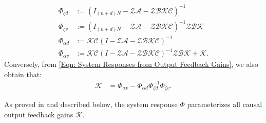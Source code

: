 \documentclass[letterpaper, 10 pt, conference]{ieeeconf}
\newcommand{\A}{\mathcal{A}}
\newcommand{\B}{\mathcal{B}}
\newcommand{\C}{\mathcal{C}}
\newcommand{\K}{\mathcal{K}}
\newcommand{\Z}{\mathcal{Z}}
\newcommand{\?}{\stackrel{?}{=}}
\newcommand{\paramDim}{d}
\newcommand{\varDim}{n}
\newcommand{\disturbance}{d}
\newcommand{\ratePGD}{\alpha}
\newcommand{\feedbackGainStacked}{\K}
\newcommand{\downshift}{\Z}
\newcommand{\systemResponse}{\Phi}
\newcommand{\jacobianStateStacked}{\A}
\newcommand{\jacobianControlStacked}{\B}
\newcommand{\outputMatrixStacked}{\C}
\newcommand{\iterationHorizon}{N}
\newcommand{\state}{\zeta}
\newcommand{\outputNoise}{v}
\newcommand{\antoine}[1]{{\textcolor[rgb]{1,0,0}{\textsf{[Antoine: {#1}]}}}}
\begin{document}
{
\setlength{\abovedisplayskip}{3.5pt}
\setlength{\belowdisplayskip}{3.5pt}
\begin{subequations} \label{Eqn: System Responses from Output Feedback Gains}
\begin{align} 
    \label{Eqn: System Response from Feedback Gains (State, Disturbance)}
    \systemResponse_{\state \disturbance} &:= (I_{(\varDim + \paramDim)\iterationHorizon} - \downshift \jacobianStateStacked - \downshift \jacobianControlStacked \feedbackGainStacked \outputMatrixStacked)^{-1} \\ \label{Eqn: System Response from Feedback Gains (State, Output Noise)}
    \systemResponse_{\state \outputNoise} &:= (I_{(\varDim + \paramDim)\iterationHorizon} - \downshift \jacobianStateStacked - \downshift \jacobianControlStacked \feedbackGainStacked \outputMatrixStacked)^{-1} \downshift \jacobianControlStacked \feedbackGainStacked \\ 
    \label{Eqn: System Response from Feedback Gains (Input, Disturbance)}
    \systemResponse_{\ratePGD \disturbance} &:= \feedbackGainStacked \outputMatrixStacked (I - \downshift \jacobianStateStacked - \downshift \jacobianControlStacked \feedbackGainStacked \outputMatrixStacked)^{-1} \\ 
    \label{Eqn: System Response from Feedback Gains (Input, Output Noise)}
    \systemResponse_{\ratePGD \outputNoise} &:= \feedbackGainStacked \outputMatrixStacked (I - \downshift \jacobianStateStacked - \downshift \jacobianControlStacked \feedbackGainStacked \outputMatrixStacked)^{-1} \downshift \jacobianControlStacked \feedbackGainStacked + \feedbackGainStacked.
\end{align}
\end{subequations}
}
\hspace{-1mm}Conversely, from \eqref{Eqn: System Responses from Output Feedback Gains}, we also obtain that:
{
\setlength{\abovedisplayskip}{3.5pt}
\setlength{\belowdisplayskip}{3.5pt}
\begin{align} \label{Eqn: Feedback Error Gains from System Response}
    \feedbackGainStacked &= \systemResponse_{\ratePGD \outputNoise} - \systemResponse_{\ratePGD \disturbance} \systemResponse_{\state \disturbance}^{-1} \systemResponse_{\state \outputNoise}.
\end{align}
}

As proved in \cite{anderson2019levelsynthesis, ZhouTzoumas2023SafeControlofPartiallyObservedLTVSystems} and described below, the system response $\systemResponse$ parameterizes all causal output feedback gains $\feedbackGainStacked$.
\end{document}

